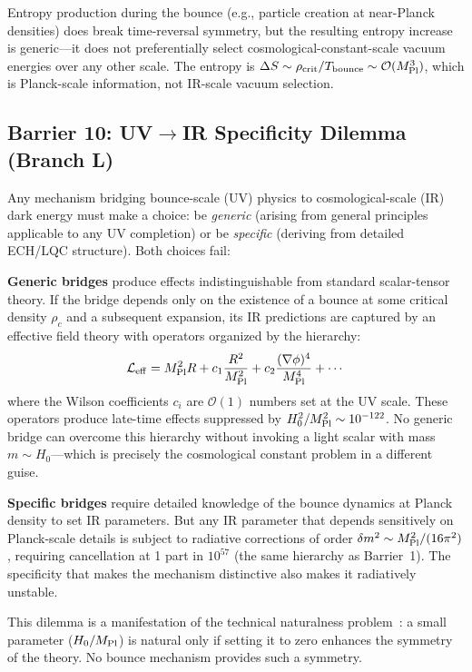 \documentclass[aps,prd,twocolumn,superscriptaddress,showpacs,preprintnumbers,nofootinbib,longbibliography,floatfix]{revtex4-2}
\newcommand{\MPl}{M_{\rm Pl}}
\begin{document}
Entropy production during the bounce (e.g., particle creation at near-Planck densities) does break time-reversal symmetry, but the resulting entropy increase is generic---it does not preferentially select cosmological-constant-scale vacuum energies over any other scale. The entropy is $\Delta S \sim \rho_{\rm crit}/T_{\rm bounce} \sim \mathcal{O}(\MPl^3)$, which is Planck-scale information, not IR-scale vacuum selection.

\subsection{Barrier 10: UV$\to$IR Specificity Dilemma (Branch L)}

Any mechanism bridging bounce-scale (UV) physics to cosmological-scale (IR) dark energy must make a choice: be \emph{generic} (arising from general principles applicable to any UV completion) or be \emph{specific} (deriving from detailed ECH/LQC structure). Both choices fail:

\textbf{Generic bridges} produce effects indistinguishable from standard scalar-tensor theory. If the bridge depends only on the existence of a bounce at some critical density $\rho_c$ and a subsequent expansion, its IR predictions are captured by an effective field theory with operators organized by the hierarchy:
\begin{equation}
\mathcal{L}_{\rm eff} = \MPl^2 R + c_1 \frac{R^2}{\MPl^2} + c_2 \frac{(\nabla\phi)^4}{\MPl^4} + \cdots
\end{equation}
where the Wilson coefficients $c_i$ are $\mathcal{O}(1)$ numbers set at the UV scale. These operators produce late-time effects suppressed by $H_0^2/\MPl^2 \sim 10^{-122}$. No generic bridge can overcome this hierarchy without invoking a light scalar with mass $m \sim H_0$---which is precisely the cosmological constant problem in a different guise.

\textbf{Specific bridges} require detailed knowledge of the bounce dynamics at Planck density to set IR parameters. But any IR parameter that depends sensitively on Planck-scale details is subject to radiative corrections of order $\delta m^2 \sim \MPl^2/(16\pi^2)$, requiring cancellation at 1 part in $10^{57}$ (the same hierarchy as Barrier~1). The specificity that makes the mechanism distinctive also makes it radiatively unstable.

This dilemma is a manifestation of the technical naturalness problem~\cite{tHooft:1979nat}: a small parameter ($H_0/\MPl$) is natural only if setting it to zero enhances the symmetry of the theory. No bounce mechanism provides such a symmetry.
\end{document}
